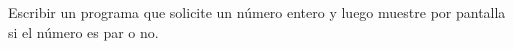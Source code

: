 ﻿
Escribir un programa que solicite un número entero y luego muestre por pantalla si el número es par o no.



\volverindice
\newpage
